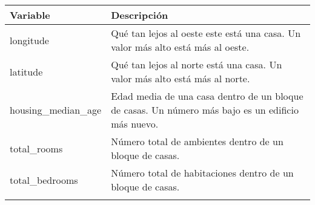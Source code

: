 \documentclass[]{article}
\begin{document}
\begin{longtable}[]{@{}ll@{}}
\toprule
\begin{minipage}[b]{0.13\columnwidth}\raggedright\strut
Variable\strut
\end{minipage} & \begin{minipage}[b]{0.17\columnwidth}\raggedright\strut
Descripción\strut
\end{minipage}\tabularnewline
\midrule
\endhead
\begin{minipage}[t]{0.13\columnwidth}\raggedright\strut
longitude\strut
\end{minipage} & \begin{minipage}[t]{0.17\columnwidth}\raggedright\strut
Qué tan lejos al oeste este está una casa. Un valor más alto está más al
oeste.\strut
\end{minipage}\tabularnewline
\begin{minipage}[t]{0.13\columnwidth}\raggedright\strut
latitude\strut
\end{minipage} & \begin{minipage}[t]{0.17\columnwidth}\raggedright\strut
Qué tan lejos al norte está una casa. Un valor más alto está más al
norte.\strut
\end{minipage}\tabularnewline
\begin{minipage}[t]{0.13\columnwidth}\raggedright\strut
housing\_median\_age\strut
\end{minipage} & \begin{minipage}[t]{0.17\columnwidth}\raggedright\strut
Edad media de una casa dentro de un bloque de casas. Un número más bajo
es un edificio más nuevo.\strut
\end{minipage}\tabularnewline
\begin{minipage}[t]{0.13\columnwidth}\raggedright\strut
total\_rooms\strut
\end{minipage} & \begin{minipage}[t]{0.17\columnwidth}\raggedright\strut
Número total de ambientes dentro de un bloque de casas.\strut
\end{minipage}\tabularnewline
\begin{minipage}[t]{0.13\columnwidth}\raggedright\strut
total\_bedrooms\strut
\end{minipage} & \begin{minipage}[t]{0.17\columnwidth}\raggedright\strut
Número total de habitaciones dentro de un bloque de casas.\strut
\end{minipage}\tabularnewline
\begin{minipage}[t]{0.13\columnwidth}\raggedright\strut

\end{minipage}
\end{longtable}
\end{document}
